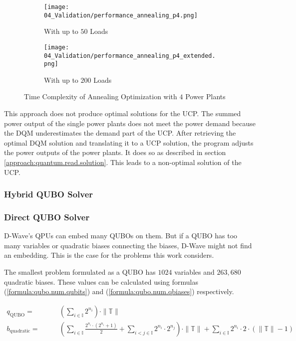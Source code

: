 \begin{figure}
  \begin{subfigure}[b]{0.5 \textwidth}
    \centering
    \texttt{[image: 04\_Validation/performance\_annealing\_p4.png]}
    \caption{With up to $50$ Loads}
    \label{figure:validation.annealing.performance}
  \end{subfigure}
  \begin{subfigure}[b]{0.5 \textwidth}
    \centering
    \texttt{[image: 04\_Validation/performance\_annealing\_p4\_extended.png]}
    \caption{With up to $200$ Loads}
    \label{figure:validation.annealin.performance.extended}
  \end{subfigure}
  \caption{Time Complexity of Annealing Optimization with $4$ Power Plants}
\end{figure}

This approach does not produce optimal solutions for the UCP.
The summed power output of the single power plants does not meet the power demand because the DQM underestimates the demand part of the UCP.
After retrieving the optimal DQM solution and translating it to a UCP solution, the program adjusts the power outputs of the power plants.
It does so as described in section \ref{approach:quantum.read.solution}.
This leads to a non-optimal solution of the UCP.

\subsubsection{Hybrid QUBO Solver}


\subsubsection{Direct QUBO Solver}

D-Wave's QPUs can embed many QUBOs on them.
But if a QUBO has too many variables or quadratic biases connecting the biases, D-Wave might not find an embedding.
This is the case for the problems this work considers.

The smallest problem formulated as a QUBO has $1024$ variables and $263, 680$ quadratic biases.
These values can be calculated using formulas (\ref{formula:qubo.num.qubits}) and (\ref{formula:qubo.num.qbiases}) respectively.


\begin{subequations}
\begin{align}
  \label{formula:qubo.num.qubits}
  q_{\text{QUBO}} = & \qquad
  \left( \sum_{i \in \mathbb{I}} 2^{n_i} \right) \cdot \| \mathbb{T} \| \\
  \label{formula:qubo.num.qbiases}
  b_{\text{quadratic}} = & \qquad
  \left(
    \sum_{i \in \mathbb{I}} \frac{2^{n_i} \cdot \left( 2^{n_i} + 1 \right)}{2}
    + \sum_{i < j \in \mathbb{I}} 2^{n_i} \cdot 2^{n_j}
  \right) \cdot \| \mathbb{T} \|
  + \sum_{i \in \mathbb{I}} 2^{n_i} \cdot 2 \cdot \left( \| \mathbb{T} \| - 1 \right)
\end{align}
\end{subequations}
